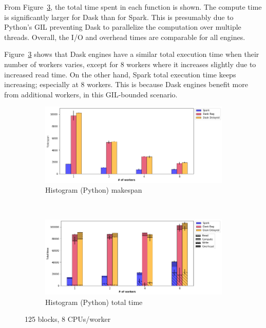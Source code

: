 \documentclass[conference]{IEEEtran}
\begin{document}
From Figure~\ref{fig:histo_tt_worker}, the total time spent in each function is
shown. The compute time is significantly larger for Dask than for Spark. This is
presumably due to Python's GIL preventing Dask to parallelize the computation
over
multiple threads. Overall, the I/O and overhead times are comparable for all engines.

Figure~\ref{fig:histo_tt_worker} shows that Dask engines have a similar
total execution time when their number of workers varies, except for 8
workers where it increases slightly due to increased read time.
On the other hand, Spark total execution time keeps increasing; especially at 8
workers. This is because Dask engines benefit more from additional workers, in
this GIL-bounded scenario.

\begin{figure}[!b]
    \centering
    \begin{subfigure}[b]{\columnwidth}
        \includegraphics[clip,width=\columnwidth]{images/histo_worker.png}%
        \caption{Histogram (Python) makespan}\label{fig:histo_ms_worker}
    \end{subfigure}
    \\
    \begin{subfigure}[b]{\columnwidth}
        \includegraphics[clip,width=\columnwidth]{images/histo_idle_worker.png}%
        \caption{Histogram (Python) total time}\label{fig:histo_tt_worker}
    \end{subfigure}
    \caption{125 blocks, 8 CPUs/worker}
\end{figure}
\end{document}
